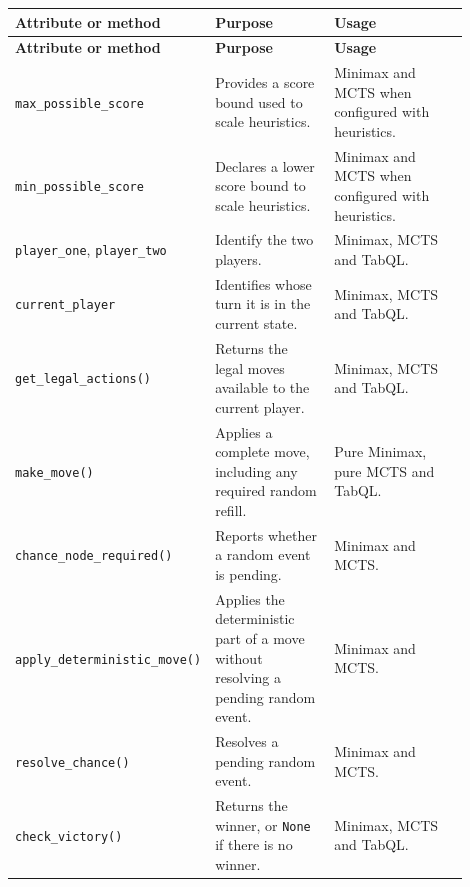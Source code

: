 \begin{longtable}{@{}p{0.22\linewidth}p{0.30\linewidth}p{0.38\linewidth}@{}}
\hline
\textbf{Attribute or method} & \textbf{Purpose} & \textbf{Usage}\\
\hline
\endfirsthead

\hline
\textbf{Attribute or method} & \textbf{Purpose} & \textbf{Usage}\\
\hline
\endhead

\hline
\endfoot

\texttt{max\_\allowbreak possible\_\allowbreak score}
& Provides a score bound used to scale heuristics.
& Minimax and MCTS when configured with heuristics.\\
\hline

\texttt{min\_\allowbreak possible\_\allowbreak score}
& Declares a lower score bound to scale heuristics.
& Minimax and MCTS when configured with heuristics.\\
\hline

\texttt{player\_\allowbreak one}, \texttt{player\_\allowbreak two}
& Identify the two players.
& Minimax, MCTS and TabQL.\\
\hline

\texttt{current\_\allowbreak player}
& Identifies whose turn it is in the current state.
& Minimax, MCTS and TabQL.\\
\hline

\texttt{get\_\allowbreak legal\_\allowbreak actions()}
& Returns the legal moves available to the current player.
& Minimax, MCTS and TabQL.\\
\hline

\texttt{make\_\allowbreak move()}
& Applies a complete move, including any required random refill.
& Pure Minimax, pure MCTS and TabQL.\\
\hline

\texttt{chance\_\allowbreak node\_\allowbreak required()}
& Reports whether a random event is pending.
& Minimax and MCTS.\\
\hline

\texttt{apply\_\allowbreak deterministic\_\allowbreak move()}
& Applies the deterministic part of a move without resolving a pending random event.
& Minimax and MCTS.\\
\hline

\texttt{resolve\_\allowbreak chance()}
& Resolves a pending random event.
& Minimax and MCTS.\\
\hline

\texttt{check\_\allowbreak victory()}
& Returns the winner, or \texttt{None} if there is no winner.
& Minimax, MCTS and TabQL.\\
\hline


\end{longtable}

